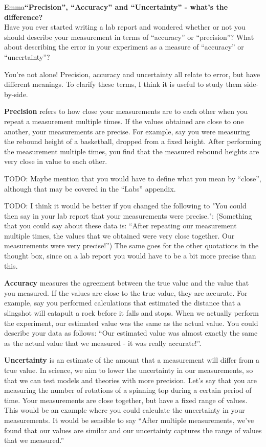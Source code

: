 \begin{studentOpinion}{Emma}{\textbf{``Precision'', ``Accuracy'' and ``Uncertainty'' - what's the difference?}}
\\Have you ever started writing a lab report and wondered whether or not you should describe your measurement in terms of ``accuracy'' or ``precision''? What about describing the error in your experiment as a measure of ``accuracy'' or ``uncertainty''? 

You're not alone! Precision, accuracy and uncertainty all relate to error, but have different meanings. To clarify these terms, I think it is useful to study them side-by-side.

\textbf{Precision}
 refers to how close your measurements are to each other when you repeat a measurement multiple times. If the values obtained are close to one another, your measurements are precise. For example, say you were measuring the rebound height of a basketball, dropped from a fixed height. After performing the measurement multiple times, you find that the measured rebound heights are very close in value to each other. 
 
 TODO: Maybe mention that you would have to define what you mean by ``close'', although that may be covered in the ``Labs'' appendix.
 
 TODO: I think it would be better if you changed the following to "You could then say in your lab report that your measurements were precise.": 
(Something that you could say about these data is: ``After repeating our measurement multiple times, the values that we obtained were very close together. Our measurements were very precise!'')
The same goes for the other quotations in the thought box, since on a lab report you would have to be a bit more precise than this.

\textbf{Accuracy}
 measures the agreement between the true value and the value that you measured. If the values are close to the true value, they are accurate. For example, say you performed calculations that estimated the distance that a slingshot will catapult a rock before it falls and stops. When we actually perform the experiment, our estimated value was the same as the actual value. You could describe your data as follows: ``Our estimated value was almost exactly the same as the actual value that we measured - it was really accurate!''.

\textbf{Uncertainty}
is an estimate of the amount that a measurement will differ from a true value. In science, we aim to lower the uncertainty in our measurements, so that we can test models and theories with more precision. Let's say that you are measuring the number of rotations of a spinning top during a certain period of time. Your measurements are close together, but have a fixed range of values. This would be an example where you could calculate the uncertainty in your measurements. It would be sensible to say ``After multiple measurements, we've found that our values are similar and our uncertainty captures the range of values that we measured.''
\end{studentOpinion}


